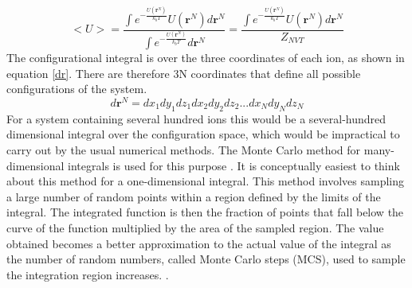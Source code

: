 \begin{equation}\label{MC_av}
<U> = \frac{ \int e^{-\frac{U(\mathbf{r}^N)}{k_bT}} U(\mathbf{r}^N) d\mathbf{r}^N}{\int e^{-\frac{U(\mathbf{r}^N)}{k_bT}} d\mathbf{r}^N}  = \frac{  \int e^{-\frac{U(\mathbf{r}^N)}{k_bT}} U(\mathbf{r}^N) d\mathbf{r}^N}{Z_{NVT}} 
\end{equation}
The configurational integral is over the three coordinates of each ion, as shown in equation \ref{dr}. There are therefore 3N coordinates that define all possible configurations of the system.
\begin{equation}d \mathbf{r}^N = dx_1 dy_1 dz_1 dx_2 dy_2 dz_2... dx_N dy_N dz_N\end{equation}\label{dr}
For a system containing several hundred ions this would be a several-hundred dimensional integral over the configuration space, which would be impractical to carry out by the usual numerical methods. The Monte Carlo method for many-dimensional integrals is used for this purpose \cite{Metropolis}. It is conceptually easiest to think about this method for a one-dimensional integral. This method involves sampling a large number of random points within a region defined by the limits of the integral. The integrated function is then the fraction of points that fall below the curve of the function multiplied by the area of the sampled region. The value obtained becomes a better approximation to the actual value of the integral as the number of random numbers, called Monte Carlo steps (MCS), used to sample the integration region increases. \cite{Lesar3}.


